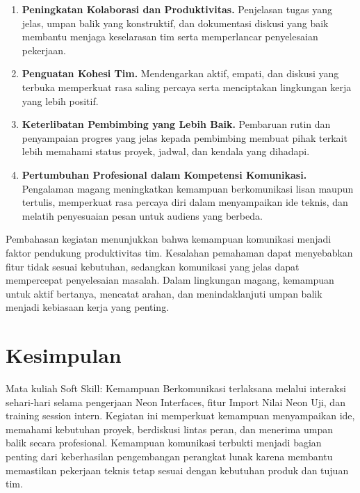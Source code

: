 \begin{enumerate}
    \item \textbf{Peningkatan Kolaborasi dan Produktivitas.} Penjelasan tugas yang jelas, umpan balik yang konstruktif, dan dokumentasi diskusi yang baik membantu menjaga keselarasan tim serta memperlancar penyelesaian pekerjaan.
    \item \textbf{Penguatan Kohesi Tim.} Mendengarkan aktif, empati, dan diskusi yang terbuka memperkuat rasa saling percaya serta menciptakan lingkungan kerja yang lebih positif.
    \item \textbf{Keterlibatan Pembimbing yang Lebih Baik.} Pembaruan rutin dan penyampaian progres yang jelas kepada pembimbing membuat pihak terkait lebih memahami status proyek, jadwal, dan kendala yang dihadapi.
    \item \textbf{Pertumbuhan Profesional dalam Kompetensi Komunikasi.} Pengalaman magang meningkatkan kemampuan berkomunikasi lisan maupun tertulis, memperkuat rasa percaya diri dalam menyampaikan ide teknis, dan melatih penyesuaian pesan untuk audiens yang berbeda.
\end{enumerate}

Pembahasan kegiatan menunjukkan bahwa kemampuan komunikasi menjadi faktor pendukung produktivitas tim. Kesalahan pemahaman dapat menyebabkan fitur tidak sesuai kebutuhan, sedangkan komunikasi yang jelas dapat mempercepat penyelesaian masalah. Dalam lingkungan magang, kemampuan untuk aktif bertanya, mencatat arahan, dan menindaklanjuti umpan balik menjadi kebiasaan kerja yang penting.

\section{Kesimpulan}
Mata kuliah Soft Skill: Kemampuan Berkomunikasi terlaksana melalui interaksi sehari-hari selama pengerjaan Neon Interfaces, fitur Import Nilai Neon Uji, dan training session intern. Kegiatan ini memperkuat kemampuan menyampaikan ide, memahami kebutuhan proyek, berdiskusi lintas peran, dan menerima umpan balik secara profesional. Kemampuan komunikasi terbukti menjadi bagian penting dari keberhasilan pengembangan perangkat lunak karena membantu memastikan pekerjaan teknis tetap sesuai dengan kebutuhan produk dan tujuan tim.

